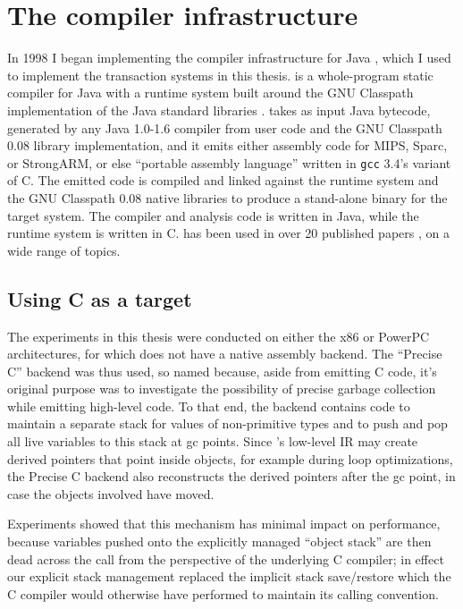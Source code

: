 \section{The \flex compiler infrastructure}
In 1998 I began implementing the \flex compiler infrastructure for
Java \cite{Flex}, which I used to implement the transaction systems
in this thesis.  
\Flex is a whole-program static compiler for Java with a runtime
system built around the GNU Classpath implementation of the Java
standard libraries \cite{Classpath}.  \Flex takes as input Java
bytecode, generated by any Java 1.0-1.6 compiler from user code and
the GNU Classpath 0.08 library implementation, and it emits either
assembly code for MIPS, Sparc, or StrongARM, or else 
``portable assembly language'' written in \texttt{gcc} 3.4's variant
of C\@.  The emitted code is compiled and linked against the \flex runtime
system and the GNU Classpath 0.08 native libraries to produce a
stand-alone binary for the target system.  The \flex compiler and
analysis code is written in Java, while the \flex runtime system is
written in C\@.
\Flex has been used in over 20
published papers
\cite{DallmeierLiWaZe06,AnanianAsKuLeLi06,Ananian05,AnanianAsKuLeLi05,SalcianuRi05,RinardSaBu04,AnanianRi03,BoyapatiSaBeRi03,FeizabadiBeRaLiRi03,GheorghioiuSaRi03,ZeeRi02,WitchelCaAs02,Gheorghioiu02,Francu02,WitchelLaAnAs01,Whaley01,Salcianu01,BeebeeRi01,Beebee01,Klock01,SalcianuRi01,VivienRi01,Ananian99,WhaleyRi99},
on a wide range of topics.


\subsection*{Using C as a target}\label{sec:precisec}
The experiments in this thesis were conducted on either the x86 or
PowerPC architectures, for which \flex does not have a native assembly
backend.  The ``Precise C'' backend was thus used, so named because,
aside from emitting C code, it's original purpose was to investigate
the possibility of precise garbage collection while emitting
high-level code.  To that end, the backend contains code to maintain a
separate stack for values of non-primitive types and to push and pop
all live variables to this stack at gc points.  Since \flex's low-level
IR may create derived pointers that point inside objects, for example
during loop optimizations, the Precise C backend also reconstructs
the derived pointers after the gc point, in case the objects involved
have moved.\label{sec:precise-gc}

Experiments showed that this mechanism has minimal impact on
performance, because variables pushed onto the explicitly managed
``object stack'' are then dead across the call from the perspective
of the underlying C compiler; in effect our explicit stack management
replaced the implicit stack save/restore which the C compiler would
otherwise have performed to maintain its calling convention.

